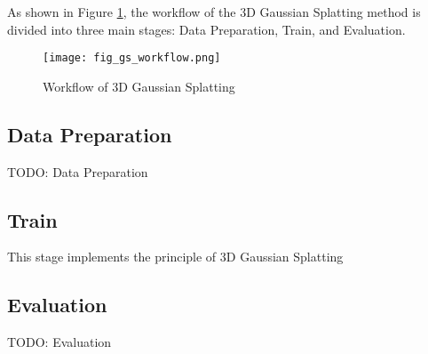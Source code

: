 As shown in Figure \ref{fig:gs_workflow}, the workflow of the 3D Gaussian Splatting method
is divided into three main stages: Data Preparation, Train, and Evaluation.

\begin{figure}
    \centering
    \texttt{[image: fig\_gs\_workflow.png]}
    \caption{Workflow of 3D Gaussian Splatting}
    \label{fig:gs_workflow}
\end{figure}

\subsection{Data Preparation}

TODO: Data Preparation

\subsection{Train}

This stage implements the principle of 3D Gaussian Splatting



\subsection{Evaluation}

TODO: Evaluation